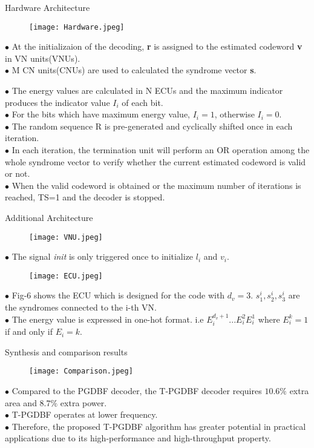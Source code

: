 \documentclass{beamer}
\begin{document}
\begin{frame}{Hardware Architecture}
    \begin{figure}[h]
    \centering
    \texttt{[image: Hardware.jpeg]}
\end{figure}
$\bullet$ At the initializaion of the decoding, \textbf{r} is assigned to the estimated codeword \textbf{v} in VN units(VNUs).\\
$\bullet$ M CN units(CNUs) are used to calculated the syndrome vector \textbf{s}.\\
 
\end{frame}
\begin{frame}{}
$\bullet$ The energy values are calculated in N ECUs and the maximum indicator produces the indicator value $I_i$ of each bit.\\
$\bullet$ For the bits which have maximum energy value, $I_i=1$, otherwise $I_i=0$.\\
$\bullet$ The random sequence R is pre-generated and cyclically shifted once in each iteration.\\
$\bullet$ In each iteration, the termination unit will perform an OR operation among the whole syndrome vector to verify whether the current estimated codeword is valid or not.\\
$\bullet$ When the valid codeword is obtained or the maximum number of iterations is reached, TS=1
and the decoder is stopped.    
\end{frame}
\begin{frame}{Additional Architecture}
    \begin{figure}[h]
    \centering
    \texttt{[image: VNU.jpeg]}
\end{figure}
$\bullet$ The signal \textit{init} is only triggered once to initialize $l_i$ and $v_i$.\\
\end{frame}
\begin{frame}{}
   \begin{figure}[h]
    \centering
    \texttt{[image: ECU.jpeg]}
\end{figure} 
$\bullet$ Fig-6 shows the ECU which is designed for the code with $d_v=3$. $s_1^i,s_2^i,s_3^i$ are the syndromes connected to the i-th VN.\\
$\bullet$ The energy value is expressed in one-hot format. i.e $E_i^{d_v+1}...E_i^2E_i^1$ where $E_i^k=1$ if and only if $E_i=k$.
\end{frame}
\begin{frame}{Synthesis and comparison results}
  \begin{figure}[h]
    \centering
    \texttt{[image: Comparison.jpeg]}
\end{figure}
$\bullet$ Compared to the PGDBF decoder, the T-PGDBF decoder requires $10.6\%$ extra area and $8.7\%$ extra power.\\
$\bullet$ T-PGDBF operates at lower frequency.\\
$\bullet$ Therefore, the proposed T-PGDBF algorithm has greater potential in practical applications due to its high-performance and high-throughput property.
\end{frame}
\end{document}
